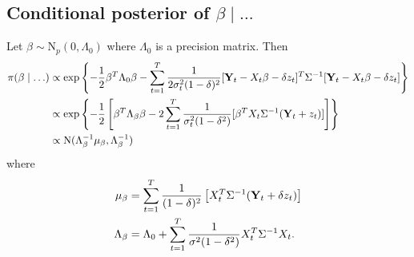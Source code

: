 \subsection*{Conditional posterior of $\beta \mid \ldots$}\label{s:betapost}
Let $\beta \sim \mbox{N}_{p}(0, \Lambda_0)$ where $\Lambda_0$ is a precision matrix. Then 
\begin{align*}
    \pi(\beta \mid \ldots) & \propto \exp \left\{ - \frac{ 1 }{ 2 } \beta^T \Lambda_0 \beta - \sum_{t = 1 }^T \frac{ 1 }{ 2 \sigma_t^2 (1 - \delta)^2 } [\mbox{\bf Y}_t - X_t \beta - \delta z_t]^T \Sigma^{-1} [\mbox{\bf Y}_t - X_t \beta - \delta z_t] \right\}\\
     & \propto \exp \left\{ -\frac{ 1 }{ 2 } \left[ \beta^T \Lambda_\beta \beta  - 2 \sum_{ t = 1 }^T \frac{ 1 }{ \sigma_t^2 (1 - \delta^2) } [ \beta^T X_t \Sigma^{-1} (\mbox{\bf Y}_t + z_t )] \right] \right\}\\
     & \propto \mbox{N} ( \Lambda_\beta^{-1} \mu_\beta , \Lambda_\beta^{-1})
\end{align*}
where
\begin{align*}
    \mu_\beta &= \sum_{t=1}^{T}\frac{ 1 }{ (1 - \delta)^2 } \left[ X_t^T \Sigma^{-1} (\mbox{\bf Y}_t + \delta z_t) \right]\\
    \Lambda_\beta &= \Lambda_0 + \sum_{ t = 1 }^{ T} \frac{ 1 }{ \sigma^2 (1 - \delta^2) } X_t^T \Sigma^{-1} X_t. 
\end{align*}
